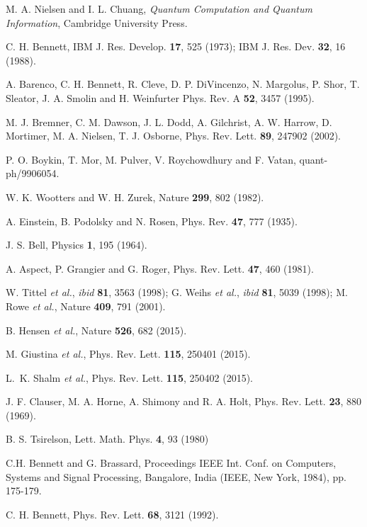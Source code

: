\documentclass[a4paper]{article}
\begin{document}
\begin{thebibliography}{99}

M. A. Nielsen and I. L. Chuang, {\sl Quantum Computation and Quantum Information},
Cambridge University Press.

C. H. Bennett, IBM J. Res. Develop. {\bf 17}, 525 (1973); IBM J.
Res. Dev. {\bf 32}, 16 (1988).

A. Barenco, C. H. Bennett, R. Cleve, D. P. DiVincenzo, N.
Margolus, P. Shor, T. Sleator, J. A. Smolin and H. Weinfurter
Phys. Rev. A {\bf 52}, 3457 (1995).

M. J. Bremner, C. M. Dawson, J. L. Dodd, A. Gilchrist, A. W.
Harrow, D. Mortimer, M. A. Nielsen, T. J. Osborne, Phys. Rev.
Lett. {\bf 89}, 247902 (2002).

P. O. Boykin, T. Mor, M. Pulver, V. Roychowdhury and F. Vatan,
quant-ph/9906054.

W. K. Wootters and W. H. Zurek, Nature {\bf 299}, 802 (1982).

A. Einstein, B. Podolsky and N. Rosen, Phys. Rev. {\bf 47}, 777
(1935).

J. S. Bell, Physics {\bf 1}, 195 (1964).

A. Aspect, P. Grangier and G. Roger, Phys. Rev. Lett. {\bf 47},
460 (1981).

W. Tittel {\sl et al.}, {\sl ibid} {\bf 81}, 3563 (1998); G.
Weihs {\sl et al.}, {\sl ibid} {\bf 81}, 5039 (1998); M. Rowe {\sl
et al.}, Nature {\bf 409}, 791 (2001).

B. Hensen {\sl et al.}, Nature \textbf{526}, 682 (2015).

M. Giustina {\sl et al.}, Phys. Rev. Lett. \textbf{115}, 250401 (2015).

L.~K. Shalm {\sl et al.}, Phys. Rev. Lett. \textbf{115}, 250402 (2015).

J. F. Clauser, M. A. Horne, A. Shimony and R. A. Holt, Phys. Rev. Lett. \textbf{23}, 880 (1969).

B. S. Tsirelson, Lett. Math. Phys. \textbf{4}, 93 (1980)

 C.H. Bennett and G. Brassard,
Proceedings IEEE Int. Conf. on Computers, Systems and Signal
Processing, Bangalore, India (IEEE, New York, 1984), pp. 175-179.

C. H. Bennett, Phys. Rev. Lett. \textbf{68}, 3121 (1992).


\end{thebibliography}
\end{document}
